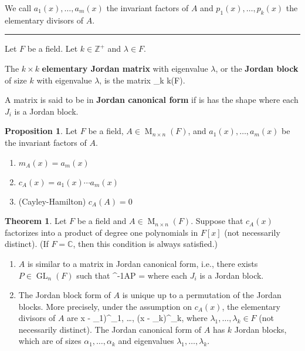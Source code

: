 \documentclass[12pt]{article}
\newcommand{\keyword}[1]{\textbf{#1}}
\def\[#1\]{\begin{align*}#1\end{align*}}
\newcommand{\sepline}{\rule{\textwidth}{0.4pt}}
\theoremstyle{definition}
\newtheorem{theorem}{Theorem}
\newtheorem{proposition}{Proposition}
\newcommand{\Z}{\mathbb{Z}}
\newcommand{\C}{\mathbb{C}}
\newcommand{\<}{\left\langle}
\renewcommand{\>}{\right\rangle}
\newcommand{\sqMat}[1]{\operatorname{M}_{#1 \times #1}}
\newcommand{\MnF}{\sqMat{n}(F)}
\newcommand{\GLn}{\operatorname{GL}_{n}}
\begin{document}
We call $a_1(x), \dots, a_m(x)$ the invariant factors of $A$ and $p_1(x), \dots, p_k(x)$ the elementary divisors of $A$.

\sepline

Let $F$ be a field. Let $k \in \Z^+$ and $\lambda \in F$.

The $k \times k$ \keyword{elementary Jordan matrix} with eigenvalue $\lambda$, or the \keyword{Jordan block} of size $k$ with eigenvalue $\lambda$, is the matrix
\[
    \mqty[
        \lambda & 1 & & 0 \\
        & \lambda & \ddots  \\
        && \ddots & 1 \\
        0&&& \lambda 
    ]
    \in \sqMat{k}(F).
\]

A matrix is said to be in \keyword{Jordan canonical form} if is has the shape
\[
    \mqty[\dmat{J_1, J_2, \ddots, J_t}]
\]
where each $J_i$ is a Jordan block.



\newpage

\begin{proposition}
    Let $F$ be a field, $A \in \MnF$, and $a_1(x), \dots, a_m(x)$ be the invariant factors of $A$.
    \begin{enumerate}[(1)]
        \item $m_A(x) = a_m(x)$
        \item $c_A(x) = a_1(x) \cdots a_m(x)$
        \item (Cayley-Hamilton) $c_A(A) = 0$
    \end{enumerate}
\end{proposition}

\begin{theorem}
    Let $F$ be a field and $A \in \MnF$. Suppose that $c_A(x)$ factorizes into a product of degree one polynomials in $F[x]$ (not necessarily distinct). (If $F = \C$, then this condition is always satisfied.)
    \begin{enumerate}[(1)]
        \item $A$ is similar to a matrix in Jordan canonical form, i.e., there exists $P \in \GLn(F)$ such that
        \[
            P^{-1}AP = 
        \]
        where each $J_i$ is a Jordan block.
        
        \item The Jordan block form of $A$ is unique up to a permutation of the Jordan blocks. More precisely, under the assumption on $c_A(x)$, the elementary divisors of $A$ are
        \[
            (x - \lambda_1)^{\alpha_1}, \dots, (x - \lambda_k)^{\alpha_k},
        \]
        where $\lambda_1, \dots, \lambda_k \in F$ (not necessarily distinct). The Jordan canonical form of $A$ has $k$ Jordan blocks, which are of sizes $\alpha_1, \dots, \alpha_k$ and eigenvalues $\lambda_1, \dots, \lambda_k$.
    \end{enumerate}
\end{theorem}
\end{document}

